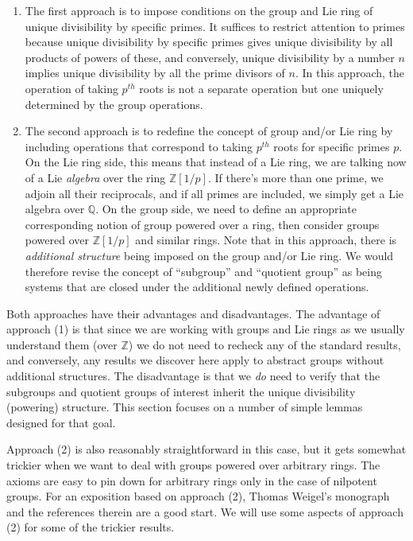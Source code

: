 \documentclass{ucetd}
\begin{document}
\begin{enumerate}
\item The first approach is to impose conditions on the group and Lie
  ring of unique divisibility by specific primes. It suffices to
  restrict attention to primes because unique divisibility by specific
  primes gives unique divisibility by all products of powers of these,
  and conversely, unique divisibility by a number $n$ implies unique
  divisibility by all the prime divisors of $n$. In this approach, the
  operation of taking $p^{th}$ roots is not a separate operation but
  one uniquely determined by the group operations.

\item The second approach is to redefine the concept of group and/or
  Lie ring by including operations that correspond to taking $p^{th}$
  roots for specific primes $p$. On the Lie ring side, this means that
  instead of a Lie ring, we are talking now of a Lie {\em algebra}
  over the ring $\mathbb{Z}[1/p]$. If there's more than one prime, we
  adjoin all their reciprocals, and if all primes are included, we
  simply get a Lie algebra over $\mathbb{Q}$. On the group side, we
  need to define an appropriate corresponding notion of group powered
  over a ring, then consider groups powered over $\mathbb{Z}[1/p]$ and
  similar rings. Note that in this approach, there is {\em additional
  structure} being imposed on the group and/or Lie ring. We would
  therefore revise the concept of ``subgroup'' and ``quotient group''
  as being systems that are closed under the additional newly defined
  operations.
\end{enumerate}

Both approaches have their advantages and disadvantages. The advantage
of approach (1) is that since we are working with groups and Lie rings
as we usually understand them (over $\mathbb{Z}$) we do not need to
recheck any of the standard results, and conversely, any results we
discover here apply to abstract groups without additional
structures. The disadvantage is that we {\em do} need to verify that
the subgroups and quotient groups of interest inherit the unique
divisibility (powering) structure. This section focuses on a number of
simple lemmas designed for that goal.

Approach (2) is also reasonably straightforward in this case, but it
gets somewhat trickier when we want to deal with groups powered over
arbitrary rings. The axioms are easy to pin down for arbitrary rings
only in the case of nilpotent groups. For an exposition based on
approach (2), Thomas Weigel's monograph \cite{Weigel} and the
references therein are a good start. We will use some aspects of
approach (2) for some of the trickier results.
\end{document}
